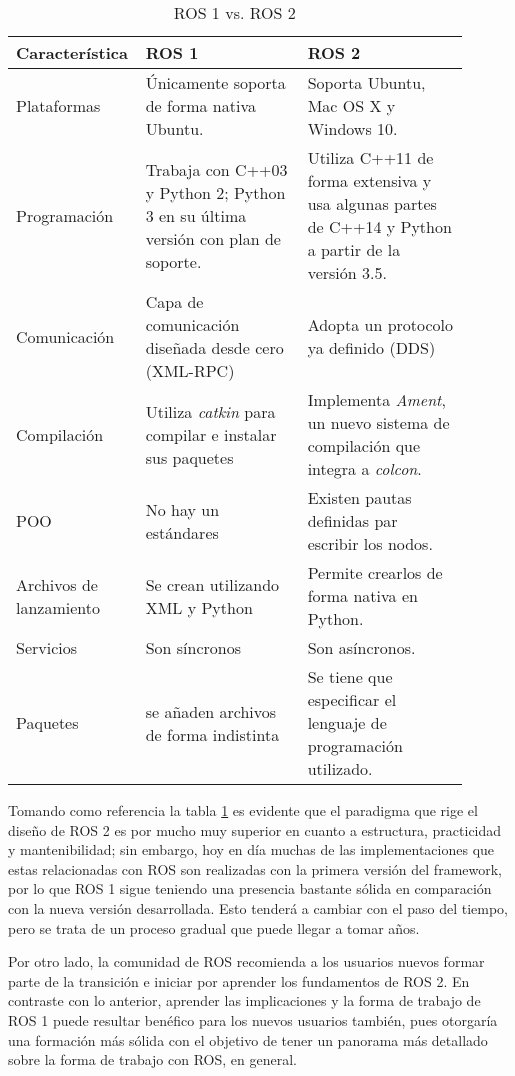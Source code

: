 \begin{table}[ht]
    \centering
    \begin{tabular}{p{0.2\linewidth} p{0.35\linewidth}p{0.35\linewidth}}
        \hline
        \textbf{Característica} & \textbf{ROS 1} & \textbf{ROS 2} \\ \hline \hline
        Plataformas & Únicamente soporta de forma nativa Ubuntu. & Soporta Ubuntu, Mac OS X y Windows 10. \\ \hline
        Programación & Trabaja con C++03 y Python 2; Python 3 en su última versión con plan de soporte. & Utiliza C++11 de forma extensiva y usa algunas partes de C++14 y Python a partir de la versión 3.5.\\ \hline
        Comunicación & Capa de comunicación diseñada desde cero (XML-RPC) & Adopta un protocolo ya definido (DDS) \\ \hline
        Compilación & Utiliza \textit{catkin} para compilar e instalar sus paquetes & Implementa \textit{Ament}, un nuevo sistema de compilación que integra a \textit{colcon}.\\ \hline
        POO & No hay un estándares & Existen pautas definidas par escribir los nodos. \\ \hline
        Archivos de lanzamiento & Se crean utilizando XML y Python & Permite crearlos de forma nativa en Python. \\ \hline
        Servicios & Son síncronos & Son asíncronos. \\ \hline
        Paquetes & se añaden archivos de forma indistinta & Se tiene que especificar el lenguaje de programación utilizado.\\ \hline \hline
    \end{tabular}
    \caption{ROS 1 vs. ROS 2}
    \label{tab:ROS1ROS2}
\end{table}

Tomando como referencia la tabla \ref{tab:ROS1ROS2} es evidente que el paradigma que rige el diseño de ROS 2 es por mucho muy superior en cuanto a estructura, practicidad y mantenibilidad; sin embargo, hoy en día muchas de las implementaciones que estas relacionadas con ROS son realizadas con la primera versión del framework, por lo que ROS 1 sigue teniendo una presencia bastante sólida en comparación con la nueva versión desarrollada. Esto tenderá a cambiar con el paso del tiempo, pero se trata de un proceso gradual que puede llegar a tomar años.

Por otro lado, la comunidad de ROS recomienda a los usuarios nuevos formar parte de la transición e iniciar por aprender los fundamentos de ROS 2. En contraste con lo anterior, aprender las implicaciones y la forma de trabajo de ROS 1 puede resultar benéfico para los nuevos usuarios también, pues otorgaría una formación más sólida con el objetivo de tener un panorama más detallado sobre la forma de trabajo con ROS, en general.

